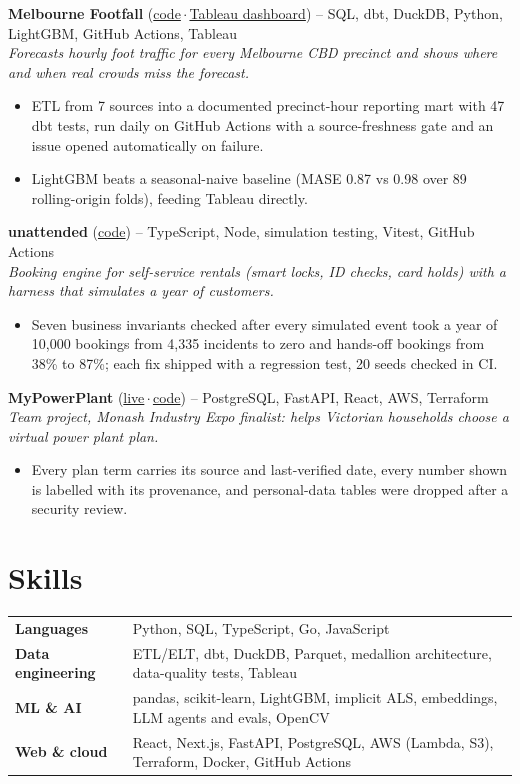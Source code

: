 \documentclass[10pt,a4paper]{article}
\newcommand{\project}[4]{%
  \textbf{#1} {\footnotesize(#2)} -- {\small #3}\\[-1pt]
  \textit{\small #4}\\[-12pt]}
\begin{document}
\project{Melbourne Footfall}{\href{https://github.com/Vanamali-Sims/howMelbMoves}{code}\,$\cdot$\,\href{https://public.tableau.com/app/profile/sai.vanamali.simhambhatla4623/viz/MelbourneFootfall/Dashboard3}{Tableau dashboard}}{SQL, dbt, DuckDB, Python, LightGBM, GitHub Actions, Tableau}
{Forecasts hourly foot traffic for every Melbourne CBD precinct and shows where and when real crowds miss the forecast.}
\begin{itemize}
  \item ETL from 7 sources into a documented precinct-hour reporting mart with 47 dbt tests, run daily on GitHub Actions
        with a source-freshness gate and an issue opened automatically on failure.
  \item LightGBM beats a seasonal-naive baseline (MASE 0.87 vs 0.98 over 89 rolling-origin folds), feeding Tableau directly.
\end{itemize}

\project{unattended}{\href{https://github.com/Vanamali-Sims/unattended-}{code}}{TypeScript, Node, simulation testing, Vitest, GitHub Actions}
{Booking engine for self-service rentals (smart locks, ID checks, card holds) with a harness that simulates a year of customers.}
\begin{itemize}
  \item Seven business invariants checked after every simulated event took a year of 10,000 bookings from 4,335 incidents to
        zero and hands-off bookings from 38\% to 87\%; each fix shipped with a regression test, 20 seeds checked in CI.
\end{itemize}

\project{MyPowerPlant}{\href{https://mypowerplant.tech}{live}\,$\cdot$\,\href{https://github.com/Vanamali-Sims/myPowerPlant}{code}}{PostgreSQL, FastAPI, React, AWS, Terraform}
{Team project, Monash Industry Expo finalist: helps Victorian households choose a virtual power plant plan.}
\begin{itemize}
  \item Every plan term carries its source and last-verified date, every number shown is labelled with its provenance, and
        personal-data tables were dropped after a security review.
\end{itemize}

\section{Skills}
\vspace{-2pt}
\begin{tabularx}{\linewidth}{@{}p{3.3cm}X@{}}
\textbf{Languages}            & Python, SQL, TypeScript, Go, JavaScript \\
\textbf{Data engineering}     & ETL/ELT, dbt, DuckDB, Parquet, medallion architecture, data-quality tests, Tableau \\
\textbf{ML \& AI}             & pandas, scikit-learn, LightGBM, implicit ALS, embeddings, LLM agents and evals, OpenCV \\
\textbf{Web \& cloud}      & React, Next.js, FastAPI, PostgreSQL, AWS (Lambda, S3), Terraform, Docker, GitHub Actions \\
\end{tabularx}
\end{document}
